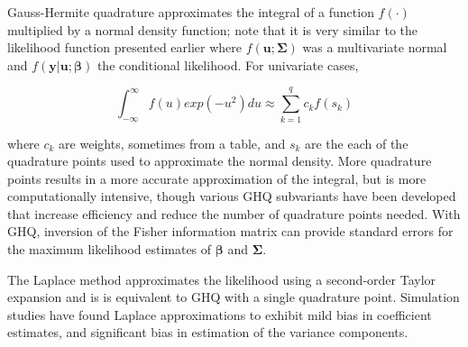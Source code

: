 \documentclass{article}
\begin{document}
\begin{flushleft}
Gauss-Hermite quadrature approximates the integral of a function $f(\cdot)$ multiplied by a normal density function; note that it is very similar to the likelihood function presented earlier where $f(\mathbf{u}; \mathbf{\Sigma})$ was a multivariate normal and $f(\mathbf{y}|\mathbf{u};\boldsymbol{\beta})$ the conditional likelihood. For univariate cases,

\begin{equation}
    \int_{-\infty}^{\infty}f(u)exp(-u^2)du \approx \sum_{k=1}^q c_kf(s_k)
\end{equation}

where $c_k$ are weights, sometimes from a table, and $s_k$ are the each of the quadrature points used to approximate the normal density. More quadrature points results in a more accurate approximation of the integral, but is more computationally intensive, though various GHQ subvariants have been developed that increase efficiency and reduce the number of quadrature points needed\cite{pinheiro_efficient_2006}. With GHQ, inversion of the Fisher information matrix can provide standard errors for the maximum likelihood estimates of $\boldsymbol{\beta}$ and $\mathbf{\Sigma}$. 


The Laplace method approximates the likelihood using a second-order Taylor expansion \cite{pinheiro_approximations_1995} and is is equivalent to GHQ with a single quadrature point\cite{liu_note_1994}. Simulation studies have found Laplace approximations to exhibit mild bias in coefficient estimates, and significant bias in estimation of the variance components\cite{pinheiro_efficient_2006}.

\end{flushleft}

\clearpage
\printbibliography
\end{document}
